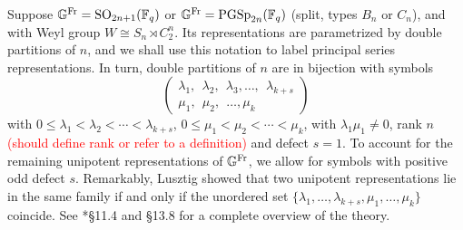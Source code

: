 \begin{example}
    Suppose $\mathbb{G}^{\mathrm{Fr}}=\mathrm{SO}_{2n+1}(\mathbb{F}_q)$ or $\mathbb{G}^{\mathrm{Fr}}=\mathrm{PGSp}_{2n}(\mathbb{F}_q)$ (split, types $B_n$ or $C_n$), and with Weyl group $W\cong S_n\rtimes C_2^n$. Its representations are parametrized by double partitions of $n$, and we shall use this notation to label principal series representations. In turn, double partitions of $n$ are in bijection with symbols 
    \begin{equation*}
        \begin{pmatrix}
            \lambda_1,\ \ \lambda_2,\ \ \lambda_3, \ldots,\ \  \lambda_{k+s}\\
            \mu_1,\ \ \mu_2,\ \ \ldots,\mu_k\ \ 
        \end{pmatrix}
    \end{equation*}
    with $0\leq\lambda_1<\lambda_2<\cdots<\lambda_{k+s}$, $0\leq\mu_1<\mu_2<\cdots<\mu_k$, with $\lambda_1\mu_1\neq0$, rank $n$ \textcolor{red}{(should define rank or refer to a definition)} and defect $s=1$. To account for the remaining unipotent representations of $\mathbb{G}^{\mathrm{Fr}}$, we allow for symbols with positive odd defect $s$. Remarkably, Lusztig showed that two unipotent representations lie in the same family if and only if the unordered set $\{\lambda_1,\ldots,\lambda_{k+s},\mu_1,\dots,\mu_k\}$ coincide. See \cite{Carter1985}*{\S11.4 and \S13.8} for a complete overview of the theory.


\end{example}
